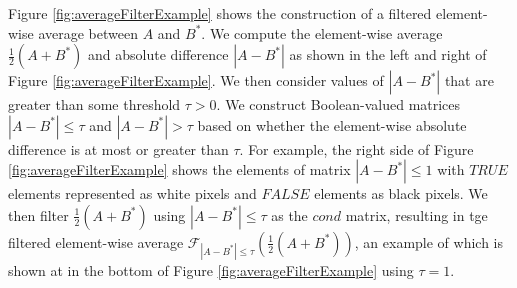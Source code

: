 \documentclass[11pt,]{isuthesis}
\begin{document}
Figure \ref{fig:averageFilterExample} shows the construction of a filtered element-wise average between \(A\) and \(B^*\).
We compute the element-wise average \(\frac{1}{2}(A + B^*)\) and absolute difference \(|A - B^*|\) as shown in the left and right of Figure \ref{fig:averageFilterExample}.
We then consider values of \(|A - B^*|\) that are greater than some threshold \(\tau > 0\).
We construct Boolean-valued matrices \(|A - B^*| \leq \tau\) and \(|A - B^*| > \tau\) based on whether the element-wise absolute difference is at most or greater than \(\tau\).
For example, the right side of Figure \ref{fig:averageFilterExample} shows the elements of matrix \(|A - B^*| \leq 1\) with \(TRUE\) elements represented as white pixels and \(FALSE\) elements as black pixels.
We then filter \(\frac{1}{2}(A + B^*)\) using \(|A - B^*| \leq \tau\) as the \(cond\) matrix, resulting in tge filtered element-wise average \(\mathcal{F}_{|A - B^*| \leq \tau}\left(\frac{1}{2}(A + B^*)\right)\), an example of which is shown at in the bottom of Figure \ref{fig:averageFilterExample} using \(\tau = 1\).
\end{document}
